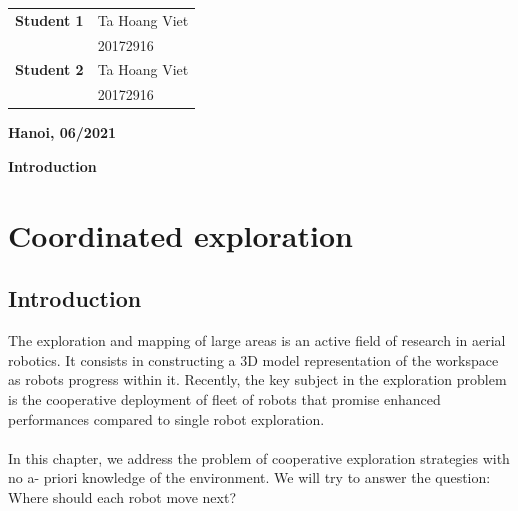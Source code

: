 \documentclass[11pt,openany]{book}
\begin{document}
\begin{titlepage}
\begin{center}
        \Large
        \begin{center}
            \begin{tabular}{ l l }
                \textbf{Student 1} & Ta Hoang Viet \\
                                   & 20172916      \\
                \textbf{Student 2} & Ta Hoang Viet \\
                                   & 20172916
            \end{tabular}
        \end{center}
        \vspace{2cm}
        \normalsize
        \textbf{Hanoi, 06/2021}
    \end{center}
\end{titlepage}
\tableofcontents
\listoffigures
\listoftables
\newpage
\thispagestyle{plain}
\begin{center}
    \Huge
    \textbf{Introduction}
\end{center}
\chapter{Coordinated exploration}
\section{Introduction}
The exploration and mapping of large areas is an active ﬁeld of research in aerial robotics. It consists in constructing a 3D model representation of the workspace as robots progress within it. Recently, the key subject in the exploration problem is the cooperative deployment of ﬂeet of robots that promise enhanced performances compared to single robot exploration.\\\\
In this chapter, we address the problem of cooperative exploration strategies with no a- priori knowledge of the environment. We will try to answer the question: Where should each robot move next?
\end{document}
